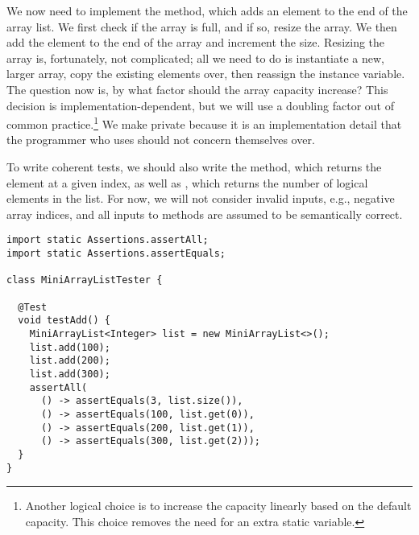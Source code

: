 We now need to implement the  method, which adds an element to the end of the array list. 
We first check if the array is full, and if so, resize the array. 
We then add the element to the end of the array and increment the size. 
Resizing the array is, fortunately, not complicated; all we need to do is instantiate a new, larger array, copy the existing elements over, then reassign the instance variable. 
The question now is, by what factor should the array capacity increase? 
This decision is implementation-dependent, but we will use a doubling factor out of common practice.\footnote{Another logical choice is to increase the capacity linearly based on the default capacity. This choice removes the need for an extra static variable.} 
We make  private because it is an implementation detail that the programmer who uses  should not concern themselves over. 

To write coherent tests, we should also write the  method, which returns the element at a given index, as well as , which returns the number of logical elements in the list. 
For now, we will not consider invalid inputs, e.g., negative array indices, and all inputs to methods are assumed to be semantically correct.

\begin{lstlisting}[language=MyJava]
import static Assertions.assertAll;
import static Assertions.assertEquals;

class MiniArrayListTester {

  @Test
  void testAdd() {
    MiniArrayList<Integer> list = new MiniArrayList<>();
    list.add(100);
    list.add(200);
    list.add(300);
    assertAll(
      () -> assertEquals(3, list.size()),
      () -> assertEquals(100, list.get(0)),
      () -> assertEquals(200, list.get(1)),
      () -> assertEquals(300, list.get(2)));
  }
}
\end{lstlisting}

